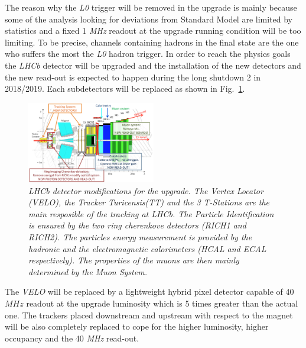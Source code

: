 \documentclass[paper=a4, fontsize=10pt]{scrartcl}
\numberwithin{equation}{section}		%
\numberwithin{figure}{section}			%
\numberwithin{table}{section}				%
\begin{document}
The reason why the \textit{L0} trigger will be removed in the upgrade is mainly because some of the analysis looking for deviations from Standard Model are limited by statistics and a fixed 1 \textit{MHz} readout at the upgrade running condition will be too limiting. To be precise, channels containing hadrons in the final state are the one who suffers the most the \textit{L0} hadron trigger.
In order to reach the physics goals the \textit{LHCb} detector will be upgraded and the installation of the new detectors and the new read-out is expected to happen during the long shutdown 2 in 2018/2019.
Each subdetectors will be replaced as shown in Fig.~\ref{Fig:Upgrade}.
\begin{figure}[h]
  \begin{center}
    \includegraphics[width=0.5\textwidth]{Images/Upgrade.png} 
  \caption[Caption for track type]{\textit{LHCb detector modifications for the upgrade. The Vertex Locator (\textit{VELO}), the Tracker Turicensis(\textit{TT}) and the 3 T-Stations are the main resposible of the tracking at LHCb. The Particle Identification is ensured by the two ring cherenkove detectors (\textit{RICH1} and \textit{RICH2}). The particles energy measurement is provided by the hadronic and the electromagnetic calorimeters (HCAL and ECAL respectively). The properties of the muons are then mainly determined by the Muon System.}}\label{Fig:Upgrade}
  \end{center}
\end{figure}

The \textit{VELO} will be replaced by a lightweight hybrid pixel detector capable of 40 $MHz$ readout at the upgrade luminosity which is 5 times greater than the actual one.
The trackers placed downstream and upstream with respect to the magnet will be also completely replaced to cope for the higher luminosity, higher occupancy and the 40 \textit{MHz} read-out.
\end{document}

